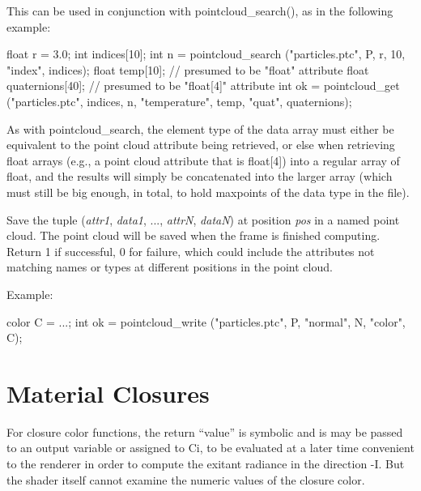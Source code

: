 \documentclass[11pt,letterpaper]{book}
\def\Ci{{\cf Ci}\xspace}
\def\colorclosure{{\cf closure color}\xspace}
\def\closurecolor{{\cf closure color}\xspace}
\begin{document}
This can be used in conjunction with {\cf pointcloud_search()}, as
in the following example:

\begin{code}
      float r = 3.0;
      int indices[10];
      int n = pointcloud_search ("particles.ptc", P, r, 10,
                                 "index", indices);
      float temp[10];         // presumed to be "float" attribute
      float quaternions[40];  // presumed to be "float[4]" attribute
      int ok = pointcloud_get ("particles.ptc", indices, n,
                               "temperature", temp,
                               "quat", quaternions);
\end{code}

As with {\cf pointcloud_search}, the element type of the data array must
either be equivalent to the point cloud attribute being retrieved, or else
when retrieving {\cf float} arrays (e.g., a point cloud attribute
that is {\cf float[4]}) into a regular array of {\cf float}, and the
results will simply be concatenated into the larger array (which must
still be big enough, in total, to hold {\cf maxpoints} of the data type
in the file).
\apiend




Save the tuple (\emph{attr1}, \emph{data1}, ..., \emph{attrN},
\emph{dataN}) at position \emph{pos} in a named point cloud.  The point
cloud will be saved when the frame is finished computing.  Return 1 if
successful, 0 for failure, which could include the attributes not
matching names or types at different positions in the point cloud.

Example:
\begin{code}
      color C = ...;
      int ok = pointcloud_write ("particles.ptc", P, "normal", N, "color", C);
\end{code}
\apiend


\newpage
\section{Material Closures}
\label{sec:stdlib:light}
\label{sec:stdlib:closures}

For \closurecolor functions, the return ``value'' is symbolic and is may
be passed to an output variable or assigned to \Ci, to be evaluated at a
later time convenient to the renderer in order to compute the exitant
radiance in the direction {\cf -I}.  But the shader itself cannot
examine the numeric values of the \colorclosure.
\end{document}

